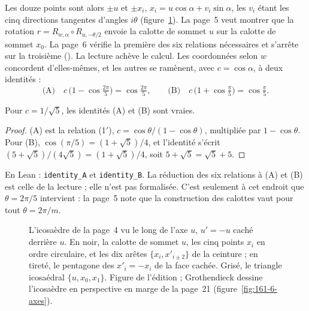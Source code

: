Les douze points sont alors $\pm u$ et $\pm x_i$, $x_i = u\cos\alpha + v_i\sin\alpha$, les $v_i$ étant les cinq directions tangentes d'angles $i\theta$ (figure~\ref{fig:161-6-calotte}). La page~5 veut montrer que la rotation $r = R_{w,\alpha} \circ R_{u,-\theta/2}$ envoie la calotte de sommet $u$ sur la calotte de sommet $x_0$. La page~6 vérifie la première des six relations nécessaires et s'arrête sur la troisième (). La lecture achève le calcul. Les coordonnées selon $w$ concordent d'elles-mêmes, et les autres se ramènent, avec $c = \cos\alpha$, à deux identités :
\[
\text{(A)}\quad c\,\bigl(1 - \cos\tfrac{2\pi}{5}\bigr) = \cos\tfrac{2\pi}{5}, \qquad \text{(B)}\quad c\,\bigl(1 + \cos\tfrac{\pi}{5}\bigr) = \cos\tfrac{\pi}{5}.
\]

\begin{enonce}
Pour $c = 1/\sqrt5$, les identités (A) et (B) sont vraies.
\end{enonce}

\begin{proof}
(A) est la relation (1$'$), $c = \cos\theta/(1 - \cos\theta)$, multipliée par $1 - \cos\theta$. Pour (B), $\cos(\pi/5) = (1 + \sqrt5)/4$, et l'identité s'écrit $(5 + \sqrt5)/(4\sqrt5) = (1 + \sqrt5)/4$, soit $5 + \sqrt5 = \sqrt5 + 5$.
\end{proof}

\noindent En Lean : \texttt{identity\_A} et \texttt{identity\_B}. La réduction des six relations à (A) et (B) est celle de la lecture ; elle n'est pas formalisée. C'est seulement à cet endroit que $\theta = 2\pi/5$ intervient : la page~5 note que la construction des calottes vaut pour tout $\theta = 2\pi/m$.

\begin{figure}[htbp]
\centering
{}
\caption{L'icosaèdre de la page~4 vu le long de l'axe $u$, $u' = -u$ caché derrière $u$. En noir, la calotte de sommet $u$, les cinq points $x_i$ en ordre circulaire, et les dix arêtes $\{x_i, x'_{i \pm 2}\}$ de la ceinture ; en tireté, le pentagone des $x'_i = -x_i$ de la face cachée. Grisé, le triangle icosaédral $\{u, x_0, x_1\}$. Figure de l'édition ; Grothendieck dessine l'icosaèdre en perspective en marge de la page~21 (figure~\ref{fig:161-6-axes}).}
\label{fig:161-6-calotte}
\end{figure}

